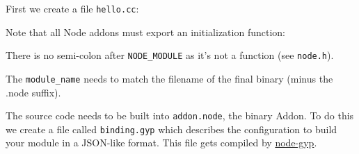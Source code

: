 First we create a file \texttt{hello.cc}:

\begin{Shaded}
\begin{Highlighting}[]
\NormalTok{>}


 \NormalTok{(} 
  \NormalTok{::}\NormalTok{();}
  \NormalTok{(}\NormalTok{::}\NormalTok{));}
\NormalTok{\}}

 
\NormalTok{\}}

\end{Highlighting}
\end{Shaded}

Note that all Node addons must export an initialization function:

\begin{Shaded}
\begin{Highlighting}[]
  
\end{Highlighting}
\end{Shaded}

There is no semi-colon after \texttt{NODE\_MODULE} as it's not a
function (see \texttt{node.h}).

The \texttt{module\_name} needs to match the filename of the final
binary (minus the .node suffix).

The source code needs to be built into \texttt{addon.node}, the binary
Addon. To do this we create a file called \texttt{binding.gyp} which
describes the configuration to build your module in a JSON-like format.
This file gets compiled by
\href{https://github.com/TooTallNate/node-gyp}{node-gyp}.

\begin{Shaded}
\begin{Highlighting}[]
\NormalTok{\{}
  \NormalTok{: [}
    \NormalTok{\{}
      \NormalTok{: }\NormalTok{,}
      \NormalTok{: [ } \NormalTok{]}
    \NormalTok{\}}
  \NormalTok{]}
\NormalTok{\}}
\end{Highlighting}
\end{Shaded}

